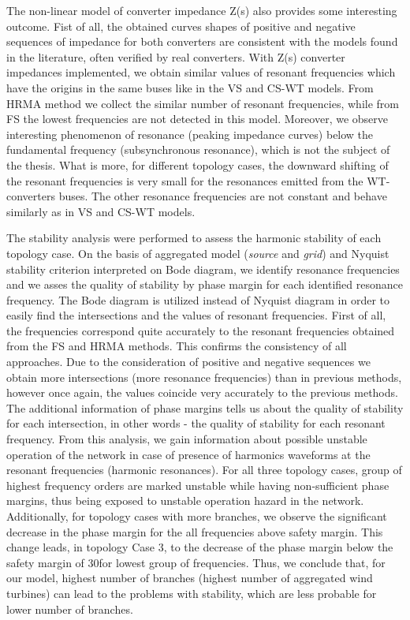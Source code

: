 \documentclass[a4paper,11pt,twoside]{report} %
\begin{document}
The non-linear model of converter impedance Z(s) also provides some interesting outcome. Fist of all, the obtained curves shapes of positive and negative sequences of impedance for both converters are consistent with the models found in the literature, often verified by real converters. With Z(s) converter impedances implemented, we obtain similar values of resonant frequencies which have the origins in the same buses like in the VS and CS-WT models. From HRMA method we collect the similar number of resonant frequencies, while from FS the lowest frequencies are not detected in this model. Moreover, we observe interesting phenomenon of resonance (peaking impedance curves) below the fundamental frequency (subsynchronous resonance), which is not the subject of the thesis. What is more, for different topology cases, the downward shifting of the resonant frequencies is very small for the resonances emitted from the WT-converters buses. The other resonance frequencies are not constant and behave similarly as in VS and CS-WT models.

The stability analysis were performed to assess the harmonic stability of each topology case. On the basis of aggregated model (\textit{source} and \textit{grid}) and Nyquist stability criterion interpreted on Bode diagram, we identify resonance frequencies and we asses the quality of stability by phase margin for each identified resonance frequency. The Bode diagram is utilized instead of Nyquist diagram in order to easily find the intersections and the values of resonant frequencies. First of all, the frequencies correspond quite accurately to the resonant frequencies obtained from the FS and HRMA methods. This confirms the consistency of all approaches. Due to the consideration of positive and negative sequences we obtain more intersections (more resonance frequencies) than in previous methods, however once again, the values coincide very accurately to the previous methods. The additional information of phase margins tells us about the quality of stability for each intersection, in other words - the quality of stability for each resonant frequency. From this analysis, we gain information about possible unstable operation of the network in case of presence of harmonics waveforms at the resonant frequencies (harmonic resonances). For all three topology cases, group of highest frequency orders are marked unstable while having non-sufficient phase margins, thus being exposed to unstable operation hazard in the network. Additionally, for topology cases with more branches, we observe the significant decrease in the phase margin for the all frequencies above safety margin. This change leads, in topology Case 3, to the decrease of the phase margin below the safety margin of 30\degree for lowest group of frequencies. Thus, we conclude that, for our model, highest number of branches (highest number of aggregated wind turbines) can lead to the problems with stability, which are less probable for lower number of branches.
\end{document}
